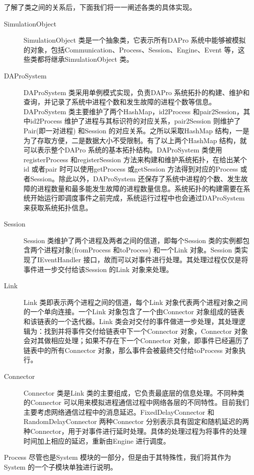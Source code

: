     了解了类之间的关系后，下面我们将一一阐述各类的具体实现。
    \begin{description}
      \item[SimulationObject] SimulationObject 类是一个抽象类，它表示所有DAPro 系统中能够被模拟的对象，包括Communication、Process、Session、Engine、Event 等，这些类都将继承SimulationObject 类。
      \item[DAProSystem] DAProSystem 类采用单例模式实现，负责DAPro 系统拓扑的构建、维护和查询，并记录了系统中进程个数和发生故障的进程个数等信息。DAProSystem 类主要维护了两个HashMap，id2Process 和pair2Session，其中id2Process 维护了进程与其标识符的对应关系，pair2Session 则维护了Pair(即一对进程) 和Session 的对应关系。之所以采取HashMap 结构，一是为了存取方便，二是数据大小不受限制。有了以上两个HashMap 结构，就可以表示整个DAPro 系统的基本拓扑结构。DAProSystem 类使用registerProcess 和registerSession 方法来构建和维护系统拓扑，在给出某个id 或者pair 时可以使用getProcess 或getSession 方法得到对应的Process 或者Session。除此以外，DAProSystem 还保存了系统中进程的个数、发生故障的进程数量和最多能发生故障的进程数量信息。系统拓扑的构建需要在系统开始运行即调度事件之前完成，系统运行过程中也会通过DAProSystem 来获取系统拓扑信息。
      \item[Session] Session 类维护了两个进程及两者之间的信道，即每个Session 类的实例都包含两个进程对象(fromProcess 和toProcess) 和一个Link 对象。Session 类实现了IEventHandler 接口，故而可以对事件进行处理。其处理过程仅仅是将事件进一步交付给该Session 的Link 对象来处理。
      \item[Link] Link 类即表示两个进程之间的信道，每个Link 对象代表两个进程对象之间的一个单向连接。一个Link 对象包含了一个由Connector 对象组成的链表和该链表的一个迭代器。Link 类会对交付的事件做进一步处理，其处理逻辑为：找到并将事件交付给链表中下一个Connector 对象，Connector 对象会对其做相应处理；如果不存在下一个Connector 对象，即事件已经遍历了链表中的所有Connector 对象，那么事件会被最终交付给toProcess 对象执行。
      \item[Connector] Connector 类是Link 类的主要组成，它负责最底层的信息处理。不同种类的Connector 可以用来模拟进程通信过程中网络各层的不同特性。目前我们主要考虑网络通信过程中的消息延迟。FixedDelayConnector 和RandomDelayConnector 两种Connector 分别表示具有固定和随机延迟的两种Connector，用于对事件进行延时处理。具体的处理过程为将事件的处理时间加上相应的延迟，重新由Engine 进行调度。
    \end{description}
    
    Process 尽管也是System 模块的一部分，但是由于其特殊性，我们将其作为System 的一个子模块单独进行说明。
    
